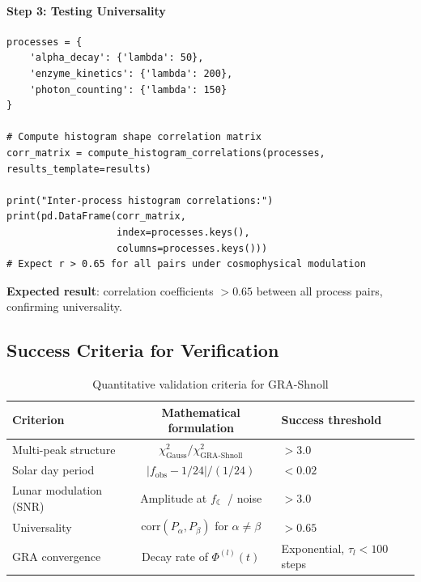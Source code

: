 \documentclass[12pt,a4paper]{article}
\theoremstyle{plain}
\theoremstyle{definition}
\theoremstyle{remark}
\newcommand{\GRA}{\text{GRA}}
\newcommand{\shnoll}{\text{Shnoll}}
\newcommand{\abs}[1]{\left|#1\right|}
\begin{document}
\paragraph{Step 3: Testing Universality}
\begin{lstlisting}[caption={Cross-process histogram correlation}, label={lst:universality-test}]
processes = {
    'alpha_decay': {'lambda': 50},
    'enzyme_kinetics': {'lambda': 200},
    'photon_counting': {'lambda': 150}
}

# Compute histogram shape correlation matrix
corr_matrix = compute_histogram_correlations(processes, results_template=results)

print("Inter-process histogram correlations:")
print(pd.DataFrame(corr_matrix, 
                   index=processes.keys(), 
                   columns=processes.keys()))
# Expect r > 0.65 for all pairs under cosmophysical modulation
\end{lstlisting}
\textbf{Expected result}: correlation coefficients $>0.65$ between all process pairs, confirming universality.

\subsection{Success Criteria for Verification}

\begin{table}[H]
\centering
\caption{Quantitative validation criteria for GRA-Shnoll}
\label{tab:success-criteria}
\renewcommand{\arraystretch}{1.4}
\begin{tabular}{@{}lcp{6cm}c@{}}
\toprule
\textbf{Criterion} & \textbf{Mathematical formulation} & \textbf{Success threshold} \\
\midrule
Multi-peak structure & $\chi^2_{\text{Gauss}} / \chi^2_{\GRA\text{-}\shnoll}$ & $> 3.0$ \\
\addlinespace
Solar day period & $\abs{f_{\text{obs}} - 1/24} / (1/24)$ & $< 0.02$ \\
\addlinespace
Lunar modulation (SNR) & Amplitude at $f_{\leftmoon}$ / noise & $> 3.0$ \\
\addlinespace
Universality & $\text{corr}(P_{\alpha}, P_{\beta})$ for $\alpha \neq \beta$ & $> 0.65$ \\
\addlinespace
GRA convergence & Decay rate of $\Phi^{(l)}(t)$ & Exponential, $\tau_l < 100$ steps \\
\bottomrule
\end{tabular}
\end{table}
\end{document}
